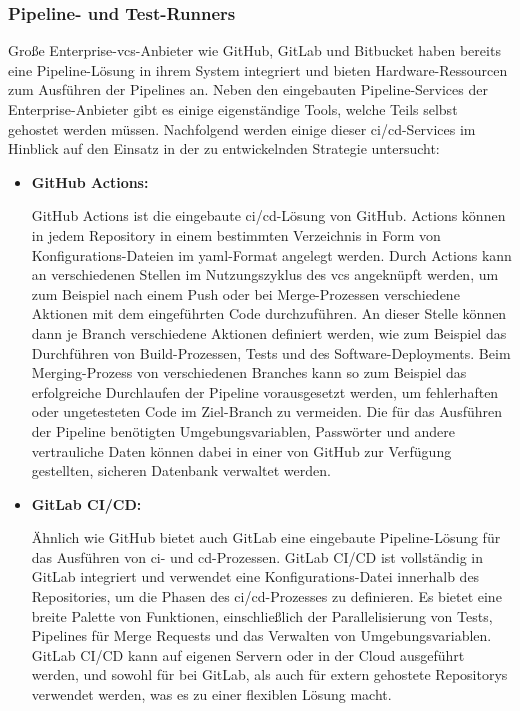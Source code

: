 \subsubsection{Pipeline- und Test-Runners}

Große Enterprise-\acrshort{vcs}-Anbieter wie GitHub, GitLab und Bitbucket haben bereits eine Pipeline-Lösung in ihrem
System integriert und bieten Hardware-Ressourcen zum Ausführen der Pipelines an.
Neben den eingebauten Pipeline-Services der Enterprise-Anbieter gibt es einige eigenständige Tools, welche Teils selbst
gehostet werden müssen.
Nachfolgend werden einige dieser \acrshort{ci}/\acrshort{cd}-Services im Hinblick auf den Einsatz in der zu
entwickelnden Strategie untersucht:

\begin{itemize}
    \item{
        \textbf{GitHub Actions:}\par
        GitHub Actions ist die eingebaute \acrshort{ci}/\acrshort{cd}-Lösung von GitHub.
        Actions können in jedem Repository in einem bestimmten Verzeichnis in Form von Konfigurations-Dateien im
        \acrshort{yaml}-Format angelegt werden.
        Durch Actions kann an verschiedenen Stellen im Nutzungszyklus des \acrshort{vcs} angeknüpft werden, um zum
        Beispiel nach einem Push oder bei Merge-Prozessen verschiedene Aktionen mit dem eingeführten Code durchzuführen.
        An dieser Stelle können dann je Branch verschiedene Aktionen definiert werden, wie zum Beispiel das Durchführen
        von Build-Prozessen, Tests und des Software-Deployments.
        Beim Merging-Prozess von verschiedenen Branches kann so zum Beispiel das erfolgreiche Durchlaufen der Pipeline
        vorausgesetzt werden, um fehlerhaften oder ungetesteten Code im Ziel-Branch zu vermeiden.
        Die für das Ausführen der Pipeline benötigten Umgebungsvariablen, Passwörter und andere vertrauliche Daten
        können dabei in einer von GitHub zur Verfügung gestellten, sicheren Datenbank verwaltet werden.
    }

    \item{
        \textbf{GitLab CI/CD:}\par
        Ähnlich wie GitHub bietet auch GitLab eine eingebaute Pipeline-Lösung für das Ausführen von \acrshort{ci}- und
        \acrshort{cd}-Prozessen.
        GitLab CI/CD ist vollständig in GitLab integriert und verwendet eine Konfigurations-Datei innerhalb des
        Repositories, um die Phasen des \acrshort{ci}/\acrshort{cd}-Prozesses zu definieren.
        Es bietet eine breite Palette von Funktionen, einschließlich der Parallelisierung von Tests, Pipelines für Merge
        Requests und das Verwalten von Umgebungsvariablen.
        GitLab CI/CD kann auf eigenen Servern oder in der Cloud ausgeführt werden, und sowohl für bei GitLab, als auch
        für extern gehostete Repositorys verwendet werden, was es zu einer flexiblen Lösung macht.
    }


\end{itemize}

